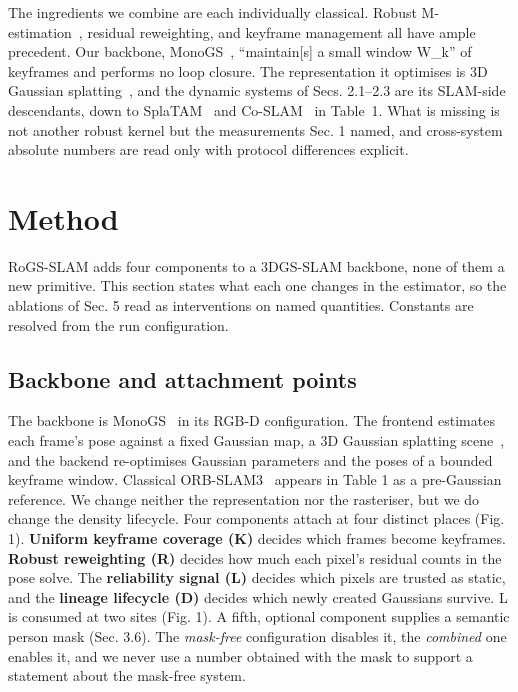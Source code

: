 The ingredients we combine are each individually classical. Robust M-estimation~\cite{huber}, residual reweighting, and keyframe management all have ample precedent. Our backbone, MonoGS~\cite{monogs}, ``maintain[s] a small window W\_k'' of keyframes and performs no loop closure. The representation it optimises is 3D Gaussian splatting~\cite{3dgs}, and the dynamic systems of Secs. 2.1--2.3 are its SLAM-side descendants, down to SplaTAM~\cite{splatam} and Co-SLAM~\cite{coslam} in Table~1. What is missing is not another robust kernel but the measurements Sec. 1 named, and cross-system absolute numbers are read only with protocol differences explicit.




\section{Method}


RoGS-SLAM adds four components to a 3DGS-SLAM backbone, none of them a new primitive. This section states what each one changes in the estimator, so the ablations of Sec. 5 read as interventions on named quantities. Constants are resolved from the run configuration.


\subsection{Backbone and attachment points}


The backbone is MonoGS~\cite{monogs} in its RGB-D configuration. The frontend estimates each frame's pose against a fixed Gaussian map, a 3D Gaussian splatting scene~\cite{3dgs}, and the backend re-optimises Gaussian parameters and the poses of a bounded keyframe window. Classical ORB-SLAM3~\cite{orbslam3} appears in Table 1 as a pre-Gaussian reference. We change neither the representation nor the rasteriser, but we do change the density lifecycle. Four components attach at four distinct places (Fig. 1). \textbf{Uniform keyframe coverage (K)} decides which frames become keyframes. \textbf{Robust reweighting (R)} decides how much each pixel's residual counts in the pose solve. The \textbf{reliability signal (L)} decides which pixels are trusted as static, and the \textbf{lineage lifecycle (D)} decides which newly created Gaussians survive. L is consumed at two sites (Fig. 1). A fifth, optional component supplies a semantic person mask (Sec. 3.6). The \emph{mask-free} configuration disables it, the \emph{combined} one enables it, and we never use a number obtained with the mask to support a statement about the mask-free system.



